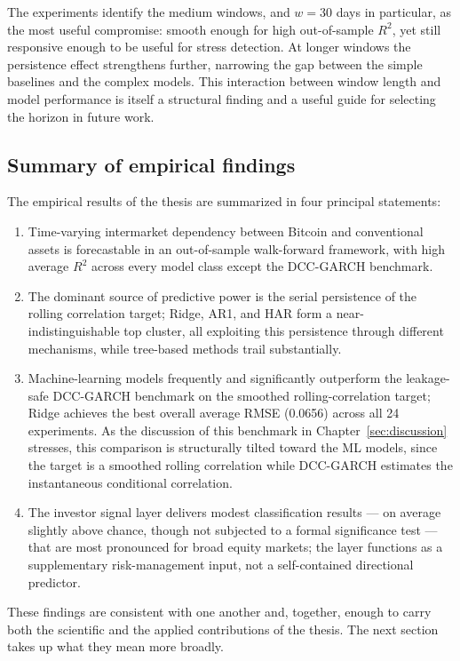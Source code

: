 The experiments identify the medium windows, and $w = 30$ days in particular, as the most useful compromise: smooth enough for high out-of-sample $R^2$, yet still responsive enough to be useful for stress detection. At longer windows the persistence effect strengthens further, narrowing the gap between the simple baselines and the complex models. This interaction between window length and model performance is itself a structural finding and a useful guide for selecting the horizon in future work.

\subsection{Summary of empirical findings}

The empirical results of the thesis are summarized in four principal statements:

\begin{enumerate}
    \item Time-varying intermarket dependency between Bitcoin and conventional assets is forecastable in an out-of-sample walk-forward framework, with high average $R^2$ across every model class except the DCC-GARCH benchmark.
    \item The dominant source of predictive power is the serial persistence of the rolling correlation target; Ridge, AR1, and HAR form a near-indistinguishable top cluster, all exploiting this persistence through different mechanisms, while tree-based methods trail substantially.
    \item Machine-learning models frequently and significantly outperform the leakage-safe DCC-GARCH benchmark on the smoothed rolling-correlation target; Ridge achieves the best overall average RMSE (0.0656) across all 24 experiments. As the discussion of this benchmark in Chapter~\ref{sec:discussion} stresses, this comparison is structurally tilted toward the ML models, since the target is a smoothed rolling correlation while DCC-GARCH estimates the instantaneous conditional correlation.
    \item The investor signal layer delivers modest classification results --- on average slightly above chance, though not subjected to a formal significance test --- that are most pronounced for broad equity markets; the layer functions as a supplementary risk-management input, not a self-contained directional predictor.
\end{enumerate}

These findings are consistent with one another and, together, enough to carry both the scientific and the applied contributions of the thesis. The next section takes up what they mean more broadly.

